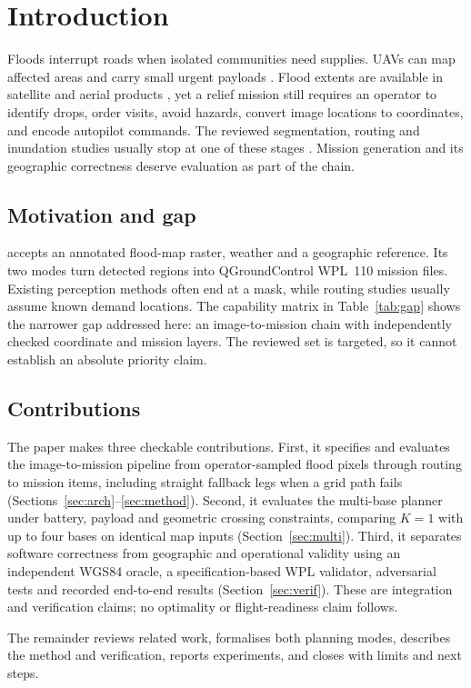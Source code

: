 \section{Introduction}
\label{sec:intro}

Floods interrupt roads when isolated communities need supplies. UAVs can map affected areas and carry small urgent payloads \cite{erdelj2017help,mohddaud2022applications}. Flood extents are available in satellite and aerial products \cite{twele2016sentinel,bonafilia2020sen1floods11}, yet a relief mission still requires an operator to identify drops, order visits, avoid hazards, convert image locations to coordinates, and encode autopilot commands. The reviewed segmentation, routing and inundation studies usually stop at one of these stages \cite{gebrehiwot2019deep,teng2017flood,otto2018optimization}. Mission generation and its geographic correctness deserve evaluation as part of the chain.

\subsection{Motivation and gap}
\adapt{} accepts an annotated flood-map raster, weather and a geographic reference. Its two modes turn detected regions into QGroundControl WPL~110 mission files. Existing perception methods often end at a mask, while routing studies usually assume known demand locations. The capability matrix in Table~\ref{tab:gap} shows the narrower gap addressed here: an image-to-mission chain with independently checked coordinate and mission layers. The reviewed set is targeted, so it cannot establish an absolute priority claim.

\subsection{Contributions}
The paper makes three checkable contributions. First, it specifies and evaluates the image-to-mission pipeline from operator-sampled flood pixels through routing to mission items, including straight fallback legs when a grid path fails (Sections~\ref{sec:arch}--\ref{sec:method}). Second, it evaluates the multi-base planner under battery, payload and geometric crossing constraints, comparing $K=1$ with up to four bases on identical map inputs (Section~\ref{sec:multi}). Third, it separates software correctness from geographic and operational validity using an independent WGS84 oracle, a specification-based WPL validator, adversarial tests and recorded end-to-end results (Section~\ref{sec:verif}). These are integration and verification claims; no optimality or flight-readiness claim follows.

The remainder reviews related work, formalises both planning modes, describes the method and verification, reports experiments, and closes with limits and next steps.
